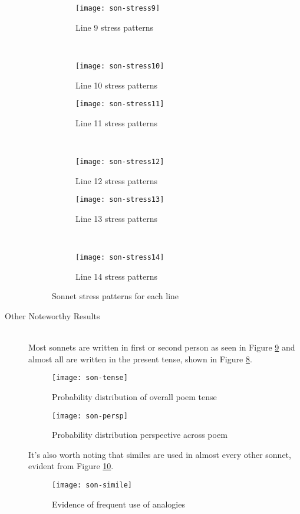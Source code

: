\begin{description}
\begin{figure}[H]
\ContinuedFloat
\centering
\begin{subfigure}[t!]{0.45\textwidth}
	\centering
    \texttt{[image: son-stress9]}
    \caption{Line 9 stress patterns}
    \label{fig:son-stress9}
\end{subfigure}
~
\begin{subfigure}[t!]{0.45\textwidth}
	\centering
    \texttt{[image: son-stress10]}
    \caption{Line 10 stress patterns}
    \label{fig:son-stress10}
\end{subfigure}
\begin{subfigure}[t!]{0.45\textwidth}
	\centering
    \texttt{[image: son-stress11]}
    \caption{Line 11 stress patterns}
    \label{fig:son-stress11}
\end{subfigure}
~
\begin{subfigure}[t!]{0.45\textwidth}
	\centering
    \texttt{[image: son-stress12]}
    \caption{Line 12 stress patterns}
    \label{fig:son-stress12}
\end{subfigure}
\begin{subfigure}[t!]{0.45\textwidth}
	\centering
    \texttt{[image: son-stress13]}
    \caption{Line 13 stress patterns}
    \label{fig:son-stress13}
\end{subfigure}
~
\begin{subfigure}[t!]{0.45\textwidth}
	\centering
    \texttt{[image: son-stress14]}
    \caption{Line 14 stress patterns}
    \label{fig:son-stress14}
\end{subfigure}
\caption{Sonnet stress patterns for each line}
\label{fig:son4}
\end{figure}

\item[Other Noteworthy Results]  \hfill \\
Most sonnets are written in first or second person as seen in Figure \ref{fig:son-persp} and almost all are written in the present tense, shown in Figure \ref{fig:son-tense}.

\begin{figure}[H]
\centering
\texttt{[image: son-tense]}
\caption{Probability distribution of overall poem tense}
\label{fig:son-tense}
\end{figure}

\begin{figure}[H]
\centering
\texttt{[image: son-persp]}
\caption{Probability distribution perspective across poem}
\label{fig:son-persp}
\end{figure}

It's also worth noting that similes are used in almost every other sonnet, evident from Figure \ref{fig:son-simile}.

\begin{figure}[H]
\centering
\texttt{[image: son-simile]}
\caption{Evidence of frequent use of analogies}
\label{fig:son-simile}
\end{figure}

\end{description}

